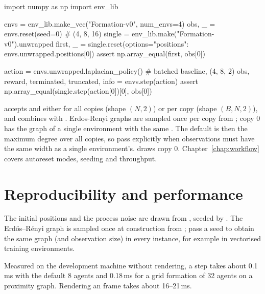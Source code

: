 \begin{pycode}
import numpy as np
import env_lib

envs = env_lib.make_vec("Formation-v0", num_envs=4)
obs, _ = envs.reset(seed=0)                     # (4, 8, 16)
single = env_lib.make("Formation-v0").unwrapped
first, _ = single.reset(options={"positions": envs.unwrapped.positions[0]})
assert np.array_equal(first, obs[0])

action = envs.unwrapped.laplacian_policy()      # batched baseline, (4, 8, 2)
obs, reward, terminated, truncated, info = envs.step(action)
assert np.array_equal(single.step(action[0])[0], obs[0])
\end{pycode}

 accepts  and 
either for all copies (shape $(N, 2)$) or per copy (shape $(B, N, 2)$), and
combines with . Erdos-Renyi graphs are sampled once per
copy from ; copy 0 has the graph of
a single environment with the same . The default
 is then the maximum degree over all copies, so pass
 explicitly when observations must have the same width as
a single environment's.  draws copy 0. Chapter~\ref{chap:workflow}
covers autoreset modes, seeding and throughput.

\section{Reproducibility and performance}\label{sec:consensus-perf}

The initial positions and the process noise are drawn from
, seeded by . The Erd\H{o}s--R\'enyi
graph is sampled once at construction from ; pass a seed to
obtain the same graph (and observation size) in every instance, for example in
vectorised training environments.

Measured on the development machine without rendering, a step takes about
0.1\,ms with the default 8 agents and 0.18\,ms for a grid formation of 32
agents on a proximity graph. Rendering an  frame takes
about 16--21\,ms.

\endgroup
